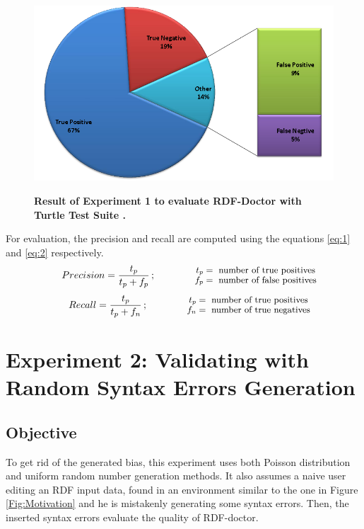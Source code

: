 \begin{figure}[ht]
\begin{center}
		\includegraphics[scale=0.5,angle=0]{images/PieChartExperiment1.png}

		\label{Fig:pieChartExperiment1}
		\caption{\textbf{Result of Experiment 1 to evaluate  RDF-Doctor with Turtle Test Suite \cite{TurtleTests:Online}.} }
\end{center}
\end{figure}

For evaluation, the precision and recall are computed using the equations \ref{eq:1} and \ref{eq:2} respectively.  
\begin{align} 
   Precision=  \frac{t_p}{t_p+f_p}\,;\qquad
\qquad\parbox{4.0cm}{\footnotesize$\begin{aligned} t_p &= \text{ number of true positives}\\[-1.0ex] f_p &= \text{ number of false positives}\end{aligned}$}
   \label{eq:1}
\end{align}
\begin{align}
   Recall =  \frac{t_p}{t_p+f_n} \,;\qquad
\qquad\parbox{4.0cm}{\footnotesize$\begin{aligned} t_p &= \text{ number of true positives}\\[-1.0ex] f_n &= \text{ number of true negatives}\end{aligned}$}
   \label{eq:2}
\end{align}



\section{Experiment 2: Validating with Random Syntax Errors Generation}
\subsection{Objective}
To get rid of the generated bias, this experiment uses both Poisson distribution and uniform random number generation methods. It also assumes a naive user editing an RDF input data, found in an environment similar to the one in Figure \ref{Fig:Motivation} and he is mistakenly generating some  syntax errors. Then, the inserted syntax errors evaluate the quality of RDF-doctor.


